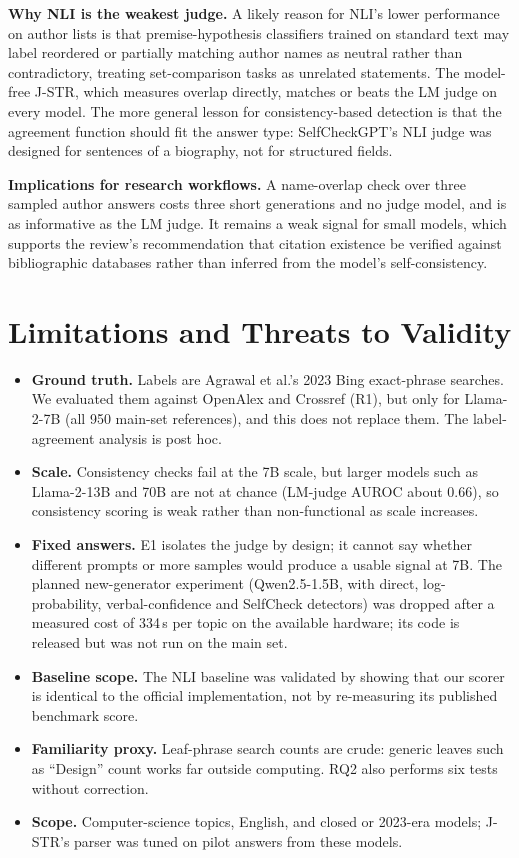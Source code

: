 \documentclass[acmsmall,screen]{acmart}
\begin{document}
\textbf{Why NLI is the weakest judge.} A likely reason for NLI’s lower performance on author lists is that premise-hypothesis classifiers trained on standard text may label reordered or partially matching author names as neutral rather than contradictory, treating set-comparison tasks as unrelated statements. The model-free J-STR, which measures overlap directly, matches or beats the LM judge on every model. The more general lesson for consistency-based detection is that the agreement function should fit the answer type: SelfCheckGPT's NLI judge was designed for sentences of a biography, not for structured fields.

\textbf{Implications for research workflows.} A name-overlap check over three sampled author answers costs three short generations and no judge model, and is as informative as the LM judge. It remains a weak signal for small models, which supports the review's recommendation that citation existence be verified against bibliographic databases rather than inferred from the model's self-consistency.

\section{Limitations and Threats to Validity}\label{sec:limits}
\begin{itemize}[leftmargin=*]
  \item \textbf{Ground truth.} Labels are Agrawal et al.'s 2023 Bing exact-phrase searches. We evaluated them against OpenAlex and Crossref (R1), but only for Llama-2-7B (all 950 main-set references), and this does not replace them. The label-agreement analysis is post hoc.
  \item \textbf{Scale.} Consistency checks fail at the 7B scale, but larger models such as Llama-2-13B and 70B are not at chance (LM-judge AUROC about 0.66), so consistency scoring is weak rather than non-functional as scale increases.
  \item \textbf{Fixed answers.} E1 isolates the judge by design; it cannot say whether different prompts or more samples would produce a usable signal at 7B. The planned new-generator experiment (Qwen2.5-1.5B, with direct, log-probability, verbal-confidence and SelfCheck detectors) was dropped after a measured cost of 334\,s per topic on the available hardware; its code is released but was not run on the main set.
  \item \textbf{Baseline scope.} The NLI baseline was validated by showing that our scorer is identical to the official implementation, not by re-measuring its published benchmark score.
  \item \textbf{Familiarity proxy.} Leaf-phrase search counts are crude: generic leaves such as ``Design'' count works far outside computing. RQ2 also performs six tests without correction.
  \item \textbf{Scope.} Computer-science topics, English, and closed or 2023-era models; J-STR's parser was tuned on pilot answers from these models.
\end{itemize}
\end{document}
